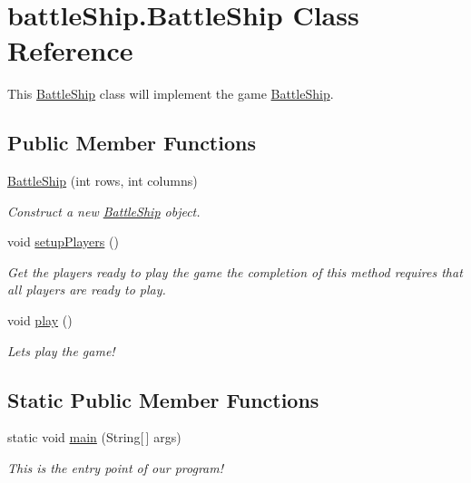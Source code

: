 \hypertarget{classbattleShip_1_1BattleShip}{\section{battle\-Ship.\-Battle\-Ship Class Reference}
\label{classbattleShip_1_1BattleShip}
}


This \hyperlink{classbattleShip_1_1BattleShip}{Battle\-Ship} class will implement the game \hyperlink{classbattleShip_1_1BattleShip}{Battle\-Ship}.  


\subsection*{Public Member Functions}
\begin{DoxyCompactItemize}
\item 
\hyperlink{classbattleShip_1_1BattleShip_a1f66570b4684f41b7e2e75cc0ee1a50a}{Battle\-Ship} (int rows, int columns)
\begin{DoxyCompactList}\small\item\em Construct a new \hyperlink{classbattleShip_1_1BattleShip}{Battle\-Ship} object. \end{DoxyCompactList}\item 
void \hyperlink{classbattleShip_1_1BattleShip_a9601c44353f90a26d8112bf4cbe93241}{setup\-Players} ()
\begin{DoxyCompactList}\small\item\em Get the players ready to play the game the completion of this method requires that all players are ready to play. \end{DoxyCompactList}\item 
\hypertarget{classbattleShip_1_1BattleShip_a011f43e5b4f5e3897bf77b2926e0d54b}{void \hyperlink{classbattleShip_1_1BattleShip_a011f43e5b4f5e3897bf77b2926e0d54b}{play} ()}\label{classbattleShip_1_1BattleShip_a011f43e5b4f5e3897bf77b2926e0d54b}

\begin{DoxyCompactList}\small\item\em Lets play the game! \end{DoxyCompactList}\end{DoxyCompactItemize}
\subsection*{Static Public Member Functions}
\begin{DoxyCompactItemize}
\item 
static void \hyperlink{classbattleShip_1_1BattleShip_aa9bf43c6d5d03b765441389c3cf091c3}{main} (String\mbox{[}$\,$\mbox{]} args)
\begin{DoxyCompactList}\small\item\em This is the entry point of our program! \end{DoxyCompactList}\end{DoxyCompactItemize}



